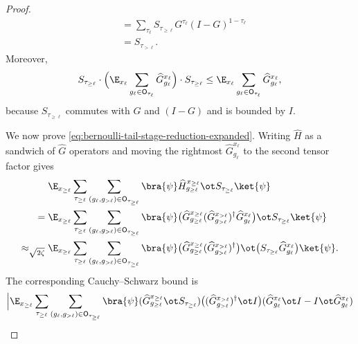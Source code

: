 \begin{proof}
\begin{align}
		 & =
		\sum_{\tau_\ell}
		S_{\tau_{\ge \ell}} G^{\tau_\ell}(I-G)^{1-\tau_\ell}\nonumber \\
		 & =
		S_{\tau_{>\ell}}.
		\label{eq:S-recurrence}
	\end{align}
	Moreover,
	\begin{align}
		S_{\tau_{\ge \ell}}
		\cdot
		\Bigl(\E_{x_\ell} \sum_{g_\ell \in \mathsf O_{\tau_\ell}} \widehat G_{g_\ell}^{x_\ell}\Bigr)
		\cdot
		S_{\tau_{\ge \ell}}
		\le
		\E_{x_\ell} \sum_{g_\ell \in \mathsf O_{\tau_\ell}} \widehat G_{g_\ell}^{x_\ell},
		\label{eq:S-sandwich}
	\end{align}
	because $S_{\tau_{\ge \ell}}$ commutes with $G$ and $(I-G)$ and is bounded by $I$.

	We now prove \ref{eq:bernoulli-tail-stage-reduction-expanded}. Writing $\widehat H$ as a sandwich of $\widehat G$ operators and moving the rightmost $\widehat G_{g_\ell}^{x_\ell}$ to the second tensor factor gives
	\begin{align}
		                          & \E_{x_{\ge \ell}} \sum_{\tau_{\ge \ell}} \sum_{(g_\ell,g_{>\ell})\in \mathsf O_{\tau_{\ge \ell}}}
		\bra{\psi} \widehat H_{g_{\ge \ell}}^{x_{\ge \ell}} \ot S_{\tau_{\ge \ell}}\ket{\psi}\nonumber                                \\
		={}                       &
		\E_{x_{\ge \ell}} \sum_{\tau_{\ge \ell}} \sum_{(g_\ell,g_{>\ell})\in \mathsf O_{\tau_{\ge \ell}}}
		\bra{\psi}
		\bigl(\widehat G_{g_{\ge \ell}}^{x_{\ge \ell}}
		(\widehat G_{g_{>\ell}}^{x_{>\ell}})^\dagger \widehat G_{g_\ell}^{x_\ell}\bigr)
		\ot S_{\tau_{\ge \ell}}\ket{\psi}\nonumber                                                                                    \\
		\approx_{\sqrt{2\zeta}}{} &
		\E_{x_{\ge \ell}} \sum_{\tau_{\ge \ell}} \sum_{(g_\ell,g_{>\ell})\in \mathsf O_{\tau_{\ge \ell}}}
		\bra{\psi}
		\bigl(\widehat G_{g_{\ge \ell}}^{x_{\ge \ell}}
		(\widehat G_{g_{>\ell}}^{x_{>\ell}})^\dagger\bigr)
		\ot \bigl(S_{\tau_{\ge \ell}}\widehat G_{g_\ell}^{x_\ell}\bigr)\ket{\psi}.
		\label{eq:move-rightmost-g-to-second-factor}
	\end{align}
	The corresponding Cauchy--Schwarz bound is
	\begin{multline}\label{eq:first-cauchy-schwarz-bound}
		\Bigl|
		\E_{x_{\ge \ell}} \sum_{\tau_{\ge \ell}} \sum_{(g_\ell,g_{>\ell})\in \mathsf O_{\tau_{\ge \ell}}}
		\bra{\psi}
		(\widehat G_{g_{\ge \ell}}^{x_{\ge \ell}} \ot S_{\tau_{\ge \ell}})
		\bigl((\widehat G_{g_{>\ell}}^{x_{>\ell}})^\dagger \ot I\bigr)
		(\widehat G_{g_\ell}^{x_\ell}\ot I - I \ot \widehat G_{g_\ell}^{x_\ell})

\end{multline}
\end{proof}
